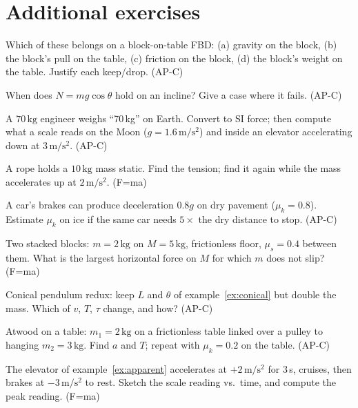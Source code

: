 \section*{Additional exercises}

\begin{exercise}[easy]
Which of these belongs on a block-on-table FBD: (a) gravity on the block,
(b) the block's pull on the table, (c) friction on the block, (d) the
block's weight on the table. Justify each keep/drop. (AP-C)
\end{exercise}
\begin{exercise}[easy]
When does $N=mg\cos\theta$ hold on an incline? Give a case where it fails.
(AP-C)
\end{exercise}
\begin{exercise}[easy]
A $70\,\mathrm{kg}$ engineer weighs ``70\,kg'' on Earth. Convert to SI force;
then compute what a scale reads on the Moon ($g=1.6\,\mathrm{m/s^{2}}$)
and inside an elevator accelerating down at $3\,\mathrm{m/s^{2}}$. (AP-C)
\end{exercise}
\begin{exercise}[easy]
A rope holds a $10\,\mathrm{kg}$ mass static. Find the tension; find it
again while the mass accelerates up at $2\,\mathrm{m/s^{2}}$. (F=ma)
\end{exercise}
\begin{exercise}[easy]
A car's brakes can produce deceleration $0.8g$ on dry pavement
($\mu_k=0.8$). Estimate $\mu_k$ on ice if the same car needs $5\times$ the
dry distance to stop. (AP-C)
\end{exercise}
\begin{exercise}[medium]
Two stacked blocks: $m=2\,\mathrm{kg}$ on $M=5\,\mathrm{kg}$, frictionless
floor, $\mu_s=0.4$ between them. What is the largest horizontal force on
$M$ for which $m$ does not slip? (F=ma)
\end{exercise}
\begin{exercise}[medium]
Conical pendulum redux: keep $L$ and $\theta$ of
example~\ref{ex:conical} but double the mass. Which of $v$, $T$, $\tau$
change, and how? (AP-C)
\end{exercise}
\begin{exercise}[medium]
Atwood on a table: $m_1=2\,\mathrm{kg}$ on a frictionless table linked over
a pulley to hanging $m_2=3\,\mathrm{kg}$. Find $a$ and $T$; repeat with
$\mu_k=0.2$ on the table. (AP-C)
\end{exercise}
\begin{exercise}[medium]
The elevator of example~\ref{ex:apparent} accelerates at
$+2\,\mathrm{m/s^{2}}$ for $3$\,s, cruises, then brakes at
$-3\,\mathrm{m/s^{2}}$ to rest. Sketch the scale reading vs.\ time, and
compute the peak reading. (F=ma)
\end{exercise}
